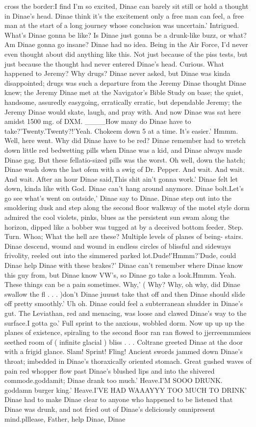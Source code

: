 \documentclass[12pt]{book}
\begin{document}
cross the border:I find I'm so excited, Dinae can barely sit still or hold a thought in Dinae's head. Dinae think it's the excitement only a free man can feel, a free man at the start of a long journey whose conclusion was uncertain.' Intrigued. What's Dinae gonna be like? Is Dinae just gonna be a drunk-like buzz, or what? Am Dinae gonna go insane? Dinae had no idea. Being in the Air Force, I'd never even thought about did anything like this. Not just because of the piss tests, but just because the thought had never entered Dinae's head. Curious. What happened to Jeremy? Why drugs? Dinae never asked, but Dinae was kinda disappointed; drugs was such a departure from the Jeremy Dinae thought Dinae knew; the Jeremy Dinae met at the Navigator's Bible Study on base; the quiet, handsome, assuredly easygoing, erratically erratic, but dependable Jeremy; the Jeremy Dinae would skate, laugh, and pray with. And now Dinae was sat here amidst 1500 mg. of DXM. \_\_\_\_How many do Dinae have to take?'Twenty.'Twenty?!'Yeah. Chokeem down 5 at a time. It's easier.' Hmmm. Well, here went. Why did Dinae have to be red? Dinae remember had to wretch down little red bedwetting pills when Dinae was a kid, and Dinae always made Dinae gag. But these fellatio-sized pills was the worst. Oh well, down the hatch; Dinae wash down the last ofem with a swig of Dr. Pepper. And wait. And wait. And wait. After an hour Dinae said,This shit ain't gonna work.' Dinae felt let down, kinda like with God. Dinae can't hang around anymore. Dinae bolt.Let's go see what's went on outside,' Dinae say to Dinae. Dinae step out into the smoldering dusk and step along the second floor walkway of the motel style dorm admired the cool violets, pinks, blues as the persistent sun swam along the horizon, dipped like a bobber was tugged at by a deceived bottom feeder. Step. Turn. Whoa; What the hell are these? Multiple levels of planes of being- stairs. Dinae descend, wound and wound in endless circles of blissful and sideways frivolity, reeled out into the simmered parked lot.Dude!'Hmmm?'Dude, could Dinae help Dinae with these brakes?' Dinae can't remember where Dinae know this guy from, but Dinae know VW's, so Dinae go take a look.Hmmm. Yeah. These things can be a pain sometimes. Why,' ( Why? Why, oh why, did Dinae swallow the fl . . .  )don't Dinae juuust take that off and then Dinae should slide off pretty smoothly.' Uh oh. Dinae could feel a subterranean shudder in Dinae's gut. The Leviathan, red and menacing, was loose and clawed Dinae's way to the surface.I gotta go.' Full sprint to the anxious, wobbled dorm. Now up up up the planes of existence, spiraling to the second floor ran ran flowed to jjerreemmmiees seethed room of ( infinite glacial ) bliss . . .  Coltrane greeted Dinae at the door with a frigid glance. Slam! Sprint! Fling! Ancient swords jammed down Dinae's throat; imbedded in Dinae's thoraxically oriented stomach. Great gushed waves of pain red whopper flow past Dinae's blushed lips and into the shivered commode.goddamit; Dinae drank too much.' Heave.I'M SOOO DRUNK. goddamn burger king.' Heave.I'VE HAD WAAAYYY TOO MUCH TO DRINK' Dinae had to make Dinae clear to anyone who happened to be listened that Dinae was drunk, and not fried out of Dinae's deliciously omnipresent mind.plllease, Father, help Dinae, Dinae 
\end{document}
